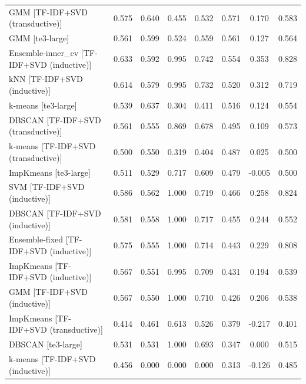 \begin{table}[htbp]
\begin{tabular}{lccccccc}
GMM [TF-IDF+SVD (transductive)] & 0.575 & 0.640 & 0.455 & 0.532 & 0.571 & 0.170 & 0.583 \\
GMM [te3-large] & 0.561 & 0.599 & 0.524 & 0.559 & 0.561 & 0.127 & 0.564 \\
Ensemble-inner\_cv [TF-IDF+SVD (inductive)] & 0.633 & 0.592 & 0.995 & 0.742 & 0.554 & 0.353 & 0.828 \\
kNN [TF-IDF+SVD (inductive)] & 0.614 & 0.579 & 0.995 & 0.732 & 0.520 & 0.312 & 0.719 \\
k-means [te3-large] & 0.539 & 0.637 & 0.304 & 0.411 & 0.516 & 0.124 & 0.554 \\
DBSCAN [TF-IDF+SVD (transductive)] & 0.561 & 0.555 & 0.869 & 0.678 & 0.495 & 0.109 & 0.573 \\
k-means [TF-IDF+SVD (transductive)] & 0.500 & 0.550 & 0.319 & 0.404 & 0.487 & 0.025 & 0.500 \\
ImpKmeans [te3-large] & 0.511 & 0.529 & 0.717 & 0.609 & 0.479 & -0.005 & 0.500 \\
SVM [TF-IDF+SVD (inductive)] & 0.586 & 0.562 & 1.000 & 0.719 & 0.466 & 0.258 & 0.824 \\
DBSCAN [TF-IDF+SVD (inductive)] & 0.581 & 0.558 & 1.000 & 0.717 & 0.455 & 0.244 & 0.552 \\
Ensemble-fixed [TF-IDF+SVD (inductive)] & 0.575 & 0.555 & 1.000 & 0.714 & 0.443 & 0.229 & 0.808 \\
ImpKmeans [TF-IDF+SVD (inductive)] & 0.567 & 0.551 & 0.995 & 0.709 & 0.431 & 0.194 & 0.539 \\
GMM [TF-IDF+SVD (inductive)] & 0.567 & 0.550 & 1.000 & 0.710 & 0.426 & 0.206 & 0.538 \\
ImpKmeans [TF-IDF+SVD (transductive)] & 0.414 & 0.461 & 0.613 & 0.526 & 0.379 & -0.217 & 0.401 \\
DBSCAN [te3-large] & 0.531 & 0.531 & 1.000 & 0.693 & 0.347 & 0.000 & 0.515 \\
k-means [TF-IDF+SVD (inductive)] & 0.456 & 0.000 & 0.000 & 0.000 & 0.313 & -0.126 & 0.485 \\
\bottomrule
\end{tabular}
\end{table}